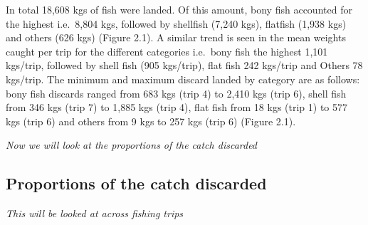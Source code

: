 \documentclass[
]{book}
\begin{document}
In total 18,608 kgs of fish were landed. Of this amount, bony fish accounted for the highest i.e.~8,804 kgs, followed by shellfish (7,240 kgs), flatfish (1,938 kgs) and others (626 kgs) (Figure 2.1). A similar trend is seen in the mean weights caught per trip for the different categories i.e.~bony fish the highest 1,101 kgs/trip, followed by shell fish (905 kgs/trip), flat fish 242 kgs/trip and Others 78 kgs/trip. The minimum and maximum discard landed by category are as follows: bony fish discards ranged from 683 kgs (trip 4) to 2,410 kgs (trip 6), shell fish from 346 kgs (trip 7) to 1,885 kgs (trip 4), flat fish from 18 kgs (trip 1) to 577 kgs (trip 6) and others from 9 kgs to 257 kgs (trip 6) (Figure 2.1).

\emph{Now we will look at the proportions of the catch discarded}

\hypertarget{proportions-of-the-catch-discarded}{%
\subsection{Proportions of the catch discarded}\label{proportions-of-the-catch-discarded}}

\emph{This will be looked at across fishing trips}
\end{document}
